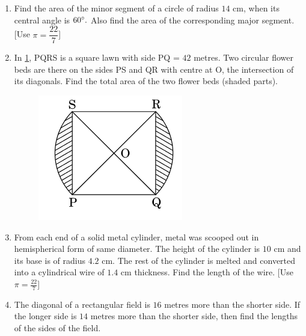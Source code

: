 \documentclass[10pt,-letter paper]{article}
\begin{document}
\begin{enumerate}
\item Find the area of the minor segment of a circle of radius $14$ cm, when its central angle is $60 \degree.$ Also find the area of the corresponding major segment. [Use $\pi =\dfrac{22}{7}$]
\item In \ref{Figure 5}, PQRS is a square lawn with side PQ = $42$ metres. Two circular flower beds are there on the sides PS and QR with centre at O, the intersection of its diagonals. Find the total area of the two flower beds (shaded parts).
 \begin{figure}[h!]
	\centering
    \includegraphics[width=0.5\columnwidth]{./figs/image5.png}
	\caption{}
	\label{Figure 5}
\end{figure}
\item From each end of a solid metal cylinder, metal was scooped out in hemispherical form of same diameter. The height of the cylinder is $10$ cm and its base is of radius $4.2$ cm. The rest of the cylinder is melted and converted into a cylindrical wire of $1.4$ cm thickness. Find the length of the wire. [Use $ \pi=\frac{22}{7} $]
\item The diagonal of a rectangular field is $16$ metres more than the shorter side. If the longer side is $14$ metres more than the shorter side, then find the lengths of the sides of the field.



\end{enumerate}
\end{document}
